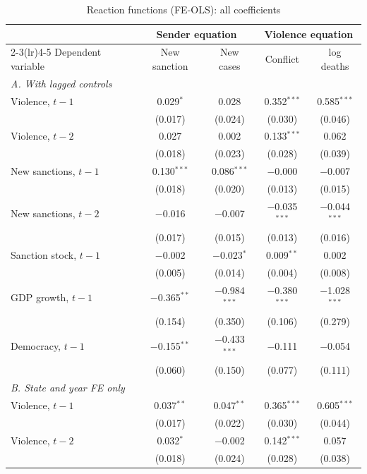 \begin{table}[htbp]
\centering
\footnotesize
\caption{Reaction functions (FE-OLS): all coefficients}
\label{tab:coefficients}
\begin{threeparttable}
\begin{tabular}{lcccc}
\toprule
 & \multicolumn{2}{c}{Sender equation} & \multicolumn{2}{c}{Violence equation} \\
\cmidrule(lr){2-3}\cmidrule(lr){4-5}
Dependent variable & New sanction & New cases & Conflict & log deaths \\
\midrule
\multicolumn{5}{l}{\textit{A. With lagged controls}} \\
\quad Violence, $t-1$ & 0.029$^{*}$ & 0.028 & 0.352$^{***}$ & 0.585$^{***}$ \\
 & (0.017) & (0.024) & (0.030) & (0.046) \\
\quad Violence, $t-2$ & 0.027 & 0.002 & 0.133$^{***}$ & 0.062 \\
 & (0.018) & (0.023) & (0.028) & (0.039) \\
\quad New sanctions, $t-1$ & 0.130$^{***}$ & 0.086$^{***}$ & $-$0.000 & $-$0.007 \\
 & (0.018) & (0.020) & (0.013) & (0.015) \\
\quad New sanctions, $t-2$ & $-$0.016 & $-$0.007 & $-$0.035$^{***}$ & $-$0.044$^{***}$ \\
 & (0.017) & (0.015) & (0.013) & (0.016) \\
\quad Sanction stock, $t-1$ & $-$0.002 & $-$0.023$^{*}$ & 0.009$^{**}$ & 0.002 \\
 & (0.005) & (0.014) & (0.004) & (0.008) \\
\quad GDP growth, $t-1$ & $-$0.365$^{**}$ & $-$0.984$^{***}$ & $-$0.380$^{***}$ & $-$1.028$^{***}$ \\
 & (0.154) & (0.350) & (0.106) & (0.279) \\
\quad Democracy, $t-1$ & $-$0.155$^{**}$ & $-$0.433$^{***}$ & $-$0.111 & $-$0.054 \\
 & (0.060) & (0.150) & (0.077) & (0.111) \\
\midrule
\multicolumn{5}{l}{\textit{B. State and year FE only}} \\
\quad Violence, $t-1$ & 0.037$^{**}$ & 0.047$^{**}$ & 0.365$^{***}$ & 0.605$^{***}$ \\
 & (0.017) & (0.022) & (0.030) & (0.044) \\
\quad Violence, $t-2$ & 0.032$^{*}$ & $-$0.002 & 0.142$^{***}$ & 0.057 \\
 & (0.018) & (0.024) & (0.028) & (0.038) \\

\end{tabular}
\end{threeparttable}
\end{table}
